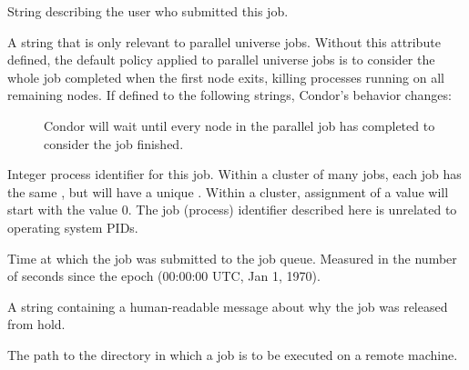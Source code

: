 \begin{description}
\item[\AdAttr{Owner}:]  String describing the user who submitted this
job.

\item[\AdAttr{ParallelShutdownPolicy}:]  A string that is only relevant
to parallel universe jobs.  Without this attribute defined, the default
policy applied to parallel universe jobs is to consider the whole job
completed when the first node exits, killing processes running on
all remaining nodes.  If defined to the following strings, Condor's
behavior changes:
  \begin{description}
  \item[] Condor will wait until every node in 
  the parallel job has completed to consider the job finished.
  \end{description}


\item[\AdAttr{ProcId}:]  Integer process identifier for this job.
Within a cluster of many jobs,
each job has the same , but will have a unique .
Within a cluster, assignment of a  value will start
with the value 0.
The job (process) identifier described here is unrelated to operating
system PIDs.


\item[\AdAttr{QDate}:]  Time at which the job was submitted to the job
queue.  Measured in the
number of seconds since the epoch (00:00:00 UTC, Jan 1, 1970).

\item[\AdAttr{ReleaseReason}:]     A string containing a human-readable
message about why the job was released from hold.

\item[\AdAttr{RemoteIwd}:]  The path to the directory in which
a job is to be executed on a remote machine.


\end{description}
